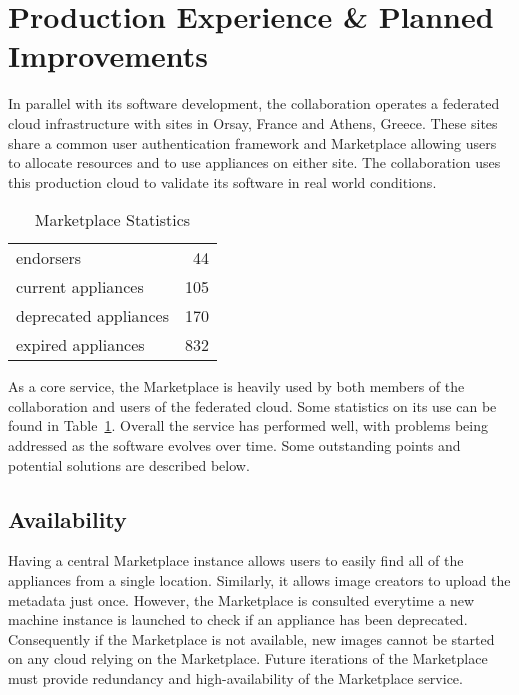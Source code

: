 \section{Production Experience \& Planned Improvements}
\label{sec:production}

In parallel with its software development, the collaboration operates
a federated cloud infrastructure with sites in Orsay, France and
Athens, Greece\@.  These sites share a common user authentication
framework and Marketplace allowing users to allocate resources and to
use appliances on either site.  The collaboration uses this production
cloud to validate its software in real world conditions.

\begin{table}
\caption{Marketplace Statistics}
\label{tab:statistics}
\begin{center}
\begin{tabular}{lr}
\hline
\hline
endorsers & 44 \\
current appliances & 105 \\
deprecated appliances & 170 \\
expired appliances & 832 \\
\hline
\hline
\end{tabular}
\end{center}
\end{table}

As a core service, the Marketplace is heavily used by both members of
the collaboration and users of the federated cloud.  Some statistics
on its use can be found in Table~\ref{tab:statistics}.  Overall the
service has performed well, with problems being addressed as the
software evolves over time.  Some outstanding points and potential
solutions are described below.

\subsection{Availability}

Having a central Marketplace instance allows users to easily find all
of the appliances from a single location.  Similarly, it allows image
creators to upload the metadata just once.  However, the Marketplace
is consulted everytime a new machine instance is launched to check if
an appliance has been deprecated.  Consequently if the Marketplace is
not available, new images cannot be started on any cloud relying on
the Marketplace\@.  Future iterations of the Marketplace must provide
redundancy and high-availability of the Marketplace service. 

